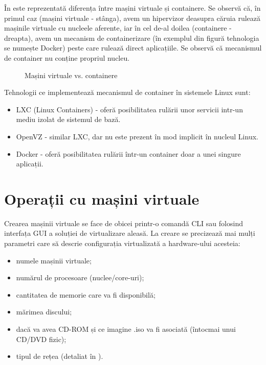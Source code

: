 În  este reprezentată
diferența între mașini virtuale și containere. Se observă că, în primul caz
(mașini virtuale - stânga), avem un hipervizor deasupra căruia rulează mașinile
virtuale cu nucleele aferente, iar în cel de-al doilea (containere - dreapta), avem un
mecanism de containerizare (în exemplul din figură tehnologia se numește Docker)
peste care rulează direct aplicațiile. Se observă că mecanismul de container nu
conține propriul nucleu.

\begin{figure}[htbp]
  \centering
  \def\svgwidth{\columnwidth}
  
  \caption{Mașini virtuale vs. containere}
  \label{fig:vm:vm-container}
\end{figure}

Tehnologii ce implementează mecanismul de container în sistemele Linux sunt:

\begin{itemize}
  \item LXC  (Linux Containers) - oferă posibilitatea
    rulării unor servicii intr-un mediu izolat de sistemul de bază.
  \item OpenVZ - similar LXC, dar nu este prezent în mod implicit în
    nucleul Linux.
  \item Docker - oferă posibilitatea rulării într-un container doar a unei
    singure aplicații.
\end{itemize}

\section{Operații cu mașini virtuale}
\label{sec:vm:ops}

Crearea mașinii virtuale se face de obicei printr-o comandă CLI sau
folosind interfața GUI a soluției de virtualizare aleasă. La creare
se precizează mai mulți parametri care să descrie configurația
virtualizată a hardware-ului acesteia:

\begin{itemize}
  \item numele mașinii virtuale;
  \item numărul de procesoare (nuclee/core-uri);
  \item cantitatea de memorie care va fi disponibilă;
  \item mărimea discului;
  \item dacă va avea CD-ROM și ce imagine .iso va fi asociată (întocmai
    unui CD/DVD fizic);
  \item tipul de rețea (detaliat în ).
\end{itemize}

